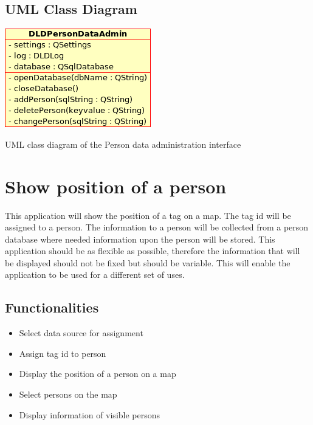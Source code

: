    \subsection{UML Class Diagram}
    \begin{staticFigure}
     \centering
     \includegraphics[scale=0.6]{UMLDiagrams/dldPersonDataAdmin.png}
     \caption{UML class diagram of the Person data administration interface}
     \label{fg:projectModularization:personDataAdmin}
    \end{staticFigure}

  \section{Show position of a person}
   \label{sec:design:showPosition}
   This application will show the position of a tag on a map. The tag id will be assigned to a person. The information to a person will be collected from a person database where needed information upon the person will be stored. This application should be as flexible as possible, therefore the information that will be displayed should not be fixed but should be variable. This will enable the application to be used for a different set of uses.

   \subsection{Functionalities}
    \begin{itemize}
     \item Select data source for assignment
     \item Assign tag id to person
     \item Display the position of a person on a map
     \item Select persons on the map
     \item Display information of visible persons
    \end{itemize}

